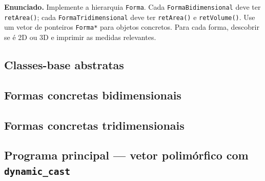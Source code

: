 \documentclass[11pt,a4paper]{article}
\begin{document}
\begin{enunciado}
\textbf{Enunciado.} Implemente a hierarquia \texttt{Forma}. Cada \texttt{FormaBidimensional} deve ter \texttt{retArea()}; cada \texttt{FormaTridimensional} deve ter \texttt{retArea()} e \texttt{retVolume()}. Use um vetor de ponteiros \texttt{Forma*} para objetos concretos. Para cada forma, descobrir se \'e 2D ou 3D e imprimir as medidas relevantes.
\end{enunciado}

\subsection*{Classes-base abstratas}








\subsection*{Formas concretas bidimensionais}










\subsection*{Formas concretas tridimensionais}










\subsection*{Programa principal --- vetor polim\'orfico com \texttt{dynamic\_cast}}
\end{document}
